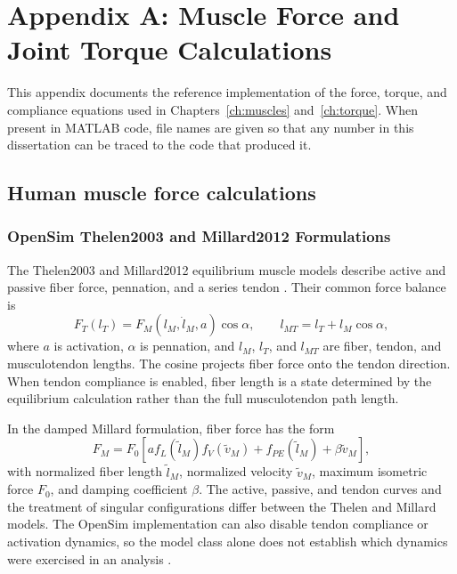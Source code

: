 \chapter{Appendix A: Muscle Force and Joint Torque Calculations}\label{app:muscle_calcs}
\graphicspath{{../Figures/92-AppendixA/}{figs/92-AppendixA/}}

This appendix documents the reference implementation of the force, torque, and compliance equations used in Chapters~\ref{ch:muscles} and~\ref{ch:torque}. When present in MATLAB code, file names are given so that any number in this dissertation can be traced to the code that produced it.

\section{Human muscle force calculations}
\subsection{OpenSim Thelen2003 and Millard2012 Formulations}

The Thelen2003 and Millard2012 equilibrium muscle models describe active and passive fiber force, pennation, and a series tendon \citep{thelen_adjustment_2003,millard_flexing_2013}. Their common force balance is
\begin{equation}
 F_T(l_T)=F_M(l_M,\dot l_M,a)\cos\alpha,
 \qquad l_{MT}=l_T+l_M\cos\alpha,
 \label{eq:app_muscle_equilibrium}
\end{equation}
where $a$ is activation, $\alpha$ is pennation, and $l_M$, $l_T$, and $l_{MT}$ are fiber, tendon, and musculotendon lengths. The cosine projects fiber force onto the tendon direction. When tendon compliance is enabled, fiber length is a state determined by the equilibrium calculation rather than the full musculotendon path length.

In the damped Millard formulation, fiber force has the form
\begin{equation}
 F_M=F_0\left[a f_L(\tilde l_M)f_V(\tilde v_M)
 + f_{PE}(\tilde l_M)+\beta\tilde v_M\right],
 \label{eq:app_millard_force}
\end{equation}
with normalized fiber length $\tilde l_M$, normalized velocity $\tilde v_M$, maximum isometric force $F_0$, and damping coefficient $\beta$. The active, passive, and tendon curves and the treatment of singular configurations differ between the Thelen and Millard models. The OpenSim implementation can also disable tendon compliance or activation dynamics, so the model class alone does not establish which dynamics were exercised in an analysis \citep{millard_flexing_2013}.

